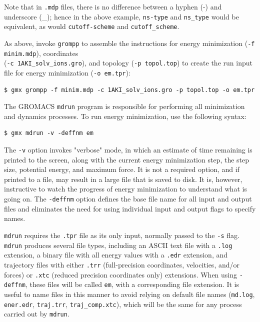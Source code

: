 \documentclass[9pt,tutorial,pubversion]{livecoms}
\begin{document}
Note that in \texttt{.mdp} files, there is no difference between a hyphen (-) and underscore (\_); hence in the above example, \texttt{ns-type} and \texttt{ns\_type} would be equivalent, as would \texttt{cutoff-scheme} and \texttt{cutoff\_scheme}.

As above, invoke \texttt{grompp} to assemble the instructions for energy minimization (\texttt{-f minim.mdp}), coordinates \\(\texttt{-c 1AKI\_solv\_ions.gro}), and topology (\texttt{-p topol.top}) to create the run input file for energy minimization (\texttt{-o em.tpr}):

\begin{lstlisting}
$ gmx grompp -f minim.mdp -c 1AKI_solv_ions.gro -p topol.top -o em.tpr
\end{lstlisting}

The GROMACS \texttt{mdrun} program is responsible for performing all minimization and dynamics processes. To run energy minimization, use the following syntax:

\begin{lstlisting}
$ gmx mdrun -v -deffnm em
\end{lstlisting}
%
The \texttt{-v} option invokes "verbose" mode, in which an estimate of time remaining is printed to the screen, along with the current energy minimization step, the step size, potential energy, and maximum force. It is not a required option, and if printed to a file, may result in a large file that is saved to disk. It is, however, instructive to watch the progress of energy minimization to understand what is going on. The \texttt{-deffnm} option defines the base file name for all input and output files and eliminates the need for using individual input and output flags to specify names. 

\texttt{mdrun} requires the \texttt{.tpr} file as its only input, normally passed to the \texttt{-s} flag. \texttt{mdrun} produces several file types, including an ASCII text file with a \texttt{.log} extension, a binary file with all energy values with a \texttt{.edr} extension, and trajectory files with either \texttt{.trr} (full-precision coordinates, velocities, and/or forces) or \texttt{.xtc} (reduced precision coordinates only) extensions. When using \texttt{-deffnm}, these files will be called \texttt{em}, with a corresponding file extension. It is useful to name files in this manner to avoid relying on default file names (\texttt{md.log}, \texttt{ener.edr}, \texttt{traj.trr}, \texttt{traj\_comp.xtc}), which will be the same for any process carried out by \texttt{mdrun}.
\end{document}
